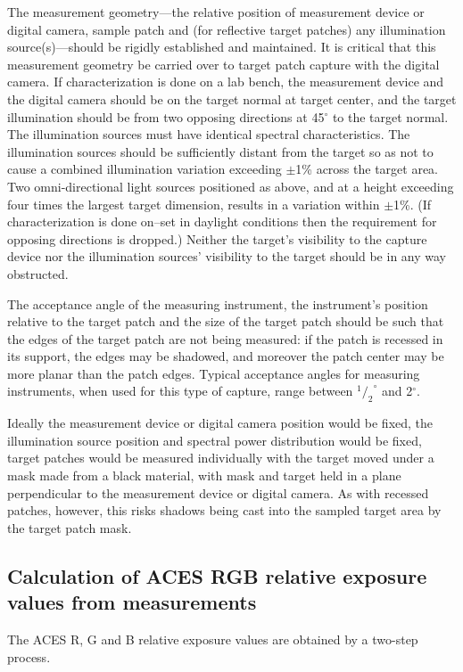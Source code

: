 The measurement geometry—the relative position of measurement device or digital camera, sample patch and (for reflective target patches) any illumination source(s)—should be rigidly established and maintained. It is critical that this measurement geometry be carried over to target patch capture with the digital camera. If characterization is done on a lab bench, the measurement device and the digital camera should be on the target normal at target center, and the target illumination should be from two opposing directions at 45$^\circ$ to the target normal. The illumination sources must have identical spectral characteristics. The illumination sources should be sufficiently distant from the target so as not to cause a combined illumination variation exceeding $\pm$1\% across the target area. Two omni-directional light sources positioned as above, and at a height exceeding four times the largest target dimension, results in a variation within $\pm$1\%. (If characterization is done on–set in daylight conditions then the requirement for opposing directions is dropped.) Neither the target's visibility to the capture device nor the illumination sources' visibility to the target should be in any way obstructed.


The acceptance angle of the measuring instrument, the instrument's position relative to the target patch and the size of the target patch should be such that the edges of the target patch are not being measured: if the patch is recessed in its support, the edges may be shadowed, and moreover the patch center may be more planar than the patch edges. Typical acceptance angles for measuring instruments, when used for this type of capture, range between ${{}^1/_2}^\circ$ and 2$^\circ$. 


Ideally the measurement device or digital camera position would be fixed, the illumination source position and spectral power distribution would be fixed, target patches would be measured individually with the target moved under a mask made from a black material, with mask and target held in a plane perpendicular to the measurement device or digital camera. As with recessed patches, however, this risks shadows being cast into the sampled target area by the target patch mask.

\subsection*{Calculation of ACES RGB relative exposure values from measurements}
The ACES R, G and B relative exposure values are obtained by a two-step process.

